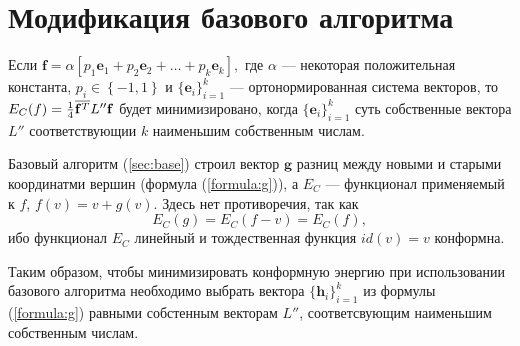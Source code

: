 \section{Модификация базового алгоритма}
\label{sec:minimization}

Если $\mathbf{f} = \alpha \left[ p_1 \mathbf{e}_1 + p_2 \mathbf{e}_2 + \dots + p_k \mathbf{e}_k \right],$ 
где $\alpha$ --- некоторая положительная константа, $p_i \in \left\{-1, 1 \right\}$ и 
$\{\mathbf{e}_i\}_{i=1}^k$ --- ортонормированная система векторов, то 
$E_C(f) = \frac{1}{4}\overline{\mathbf{f}^T} L'' \mathbf{f}$ будет минимизировано, 
когда $\{\mathbf{e}_i\}_{i=1}^k$ суть собственные вектора $L''$ соответствующии $k$ наименьшим 
собственным числам. 

Базовый алгоритм (\ref{sec:base}) строил вектор $\mathbf{g}$ разниц между новыми и старыми
координатми вершин (формула (\ref{formula:g})), а $E_C$ --- функционал применяемый к $f$, 
$f(v) = v + g(v)$. Здесь нет противоречия, так как $$E_C(g) = E_C(f - v) = E_C(f),$$ ибо
функционал $E_C$ линейный и тождественная функция $id(v) = v$ конформна. 

Таким образом, чтобы минимизировать конформную энергию при использовании базового алгоритма 
необходимо выбрать вектора $\{\mathbf{h}_i\}_{i=1}^k$ из формулы (\ref{formula:g}) равными собстенным векторам $L''$, соответсвующим наименьшим собственным числам.

